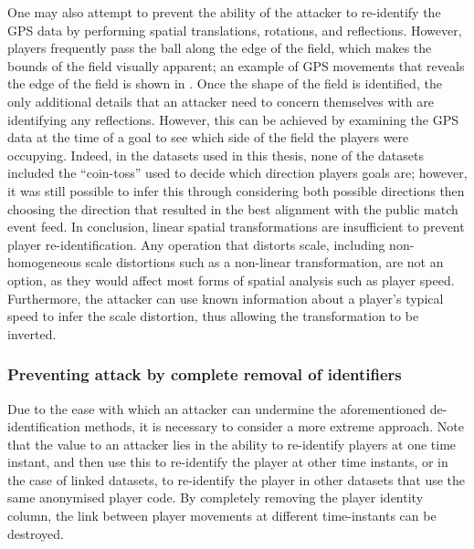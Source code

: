 One may also attempt to prevent the ability of the attacker to re-identify the GPS data by performing spatial translations, rotations, and reflections. However, players frequently pass the ball along the edge of the field, which makes the bounds of the field visually apparent; an example of GPS movements that reveals the edge of the field is shown in . Once the shape of the field is identified, the only additional details that an attacker need to concern themselves with are identifying any reflections. However, this can be achieved by examining the GPS data at the time of a goal to see which side of the field the players were occupying. Indeed, in the datasets used in this thesis, none of the datasets included the ``coin-toss'' used to decide which direction players goals are; however, it was still possible to infer this through considering both possible directions then choosing the direction that resulted in the best alignment with the public match event feed. In conclusion, linear spatial transformations are insufficient to prevent player re-identification. Any operation that distorts scale, including non-homogeneous scale distortions such as a non-linear transformation, are not an option, as they would affect most forms of spatial analysis such as player speed. Furthermore, the attacker can use known information about a player's typical speed to infer the scale distortion, thus allowing the transformation to be inverted.

\subsubsection{Preventing attack by complete removal of identifiers}
\label{sec:de-identification-removal}


Due to the ease with which an attacker can undermine the aforementioned de-identification methods, it is necessary to consider a more extreme approach. Note that the value to an attacker lies in the ability to re-identify players at one time instant, and then use this to re-identify the player at other time instants, or in the case of linked datasets, to re-identify the player in other datasets that use the same anonymised player code. By completely removing the player identity column, the link between player movements at different time-instants can be destroyed.

